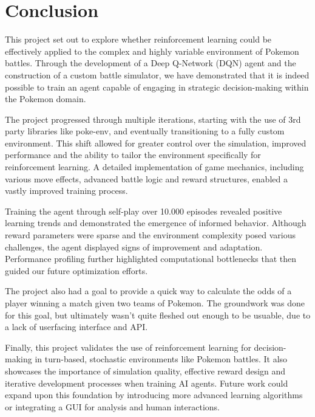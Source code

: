 \chapter{Conclusion}
\label{chap:conclusion}

This project set out to explore whether reinforcement learning could be effectively applied to the complex and highly variable
environment of Pokemon battles. Through the development of a Deep Q-Network (DQN) agent and the construction of a custom
battle simulator, we have demonstrated that it is indeed possible to train an agent capable of engaging in
strategic decision-making within the Pokemon domain.

The project progressed through multiple iterations, starting with the use of 3rd party libraries like poke-env, and eventually
transitioning to a fully custom environment. This shift allowed for greater control over the simulation, improved performance
and the ability to tailor the environment specifically for reinforcement learning. A detailed implementation of game mechanics,
including various move effects, advanced battle logic and reward structures, enabled a vastly improved training process.

Training the agent through self-play over 10.000 episodes revealed positive learning trends and demonstrated the emergence of
informed behavior. Although reward parameters were sparse and the environment complexity posed various challenges, the agent displayed
signs of improvement and adaptation. Performance profiling further highlighted computational bottlenecks that then guided our future
optimization efforts.

The project also had a goal to provide a quick way to calculate the odds of a player winning a match given two teams of Pokemon.
The groundwork was done for this goal, but ultimately wasn't quite fleshed out enough to be usuable, due to a lack of userfacing
interface and API. 

Finally, this project validates the use of reinforcement learning for decision-making in turn-based, stochastic environments
like Pokemon battles. It also showcases the importance of simulation quality, effective reward design and iterative development 
processes when training AI agents. Future work could expand upon this foundation by introducing more advanced learning 
algorithms or integrating a GUI for analysis and human interactions.

